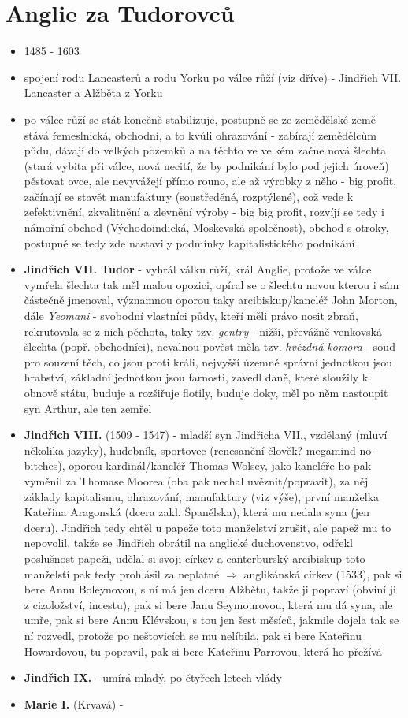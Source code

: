 \documentclass{article}
\begin{document}
\part{Anglie za Tudorovců}
\begin{itemize}
  \item 1485 - 1603
  \item spojení rodu Lancasterů a rodu Yorku po válce růží (viz dříve) - Jindřich VII. Lancaster a Alžběta z Yorku
  \item po válce růží se stát konečně stabilizuje, postupně se ze zemědělské země stává řemeslnická, obchodní, a to kvůli ohrazování - zabírají zemědělcům půdu, dávají do velkých pozemků a na těchto ve velkém začne nová šlechta (stará vybita při válce, nová necití, že by podnikání bylo pod jejich úroveň) pěstovat ovce, ale nevyvážejí přímo rouno, ale až výrobky z něho - big profit, začínají se stavět manufaktury (soustředěné, rozptýlené), což vede k zefektivnění, zkvalitnění a zlevnění výroby - big big profit, rozvíjí se tedy i námořní obchod (Východoindická, Moskevská společnost), obchod s otroky, postupně se tedy zde nastavily podmínky kapitalistického podnikání
  \item \textbf{Jindřich VII. Tudor} - vyhrál válku růží, král Anglie, protože ve válce vymřela šlechta tak měl malou opozici, opíral se o šlechtu novou kterou i sám částečně jmenoval, významnou oporou taky arcibiskup/kancléř John Morton, dále \textit{Yeomani} - svobodní vlastníci půdy, kteří měli právo nosit zbraň, rekrutovala se z nich pěchota, taky tzv. \textit{gentry} - nižší, převážně venkovská šlechta (popř. obchodníci), nevalnou pověst měla tzv. \textit{hvězdná komora} - soud pro souzení těch, co jsou proti králi, nejvyšší územně správní jednotkou jsou hrabství, základní jednotkou jsou farnosti, zavedl daně, které sloužily k obnově státu, buduje a rozšiřuje flotily, buduje doky, měl po něm nastoupit syn Arthur, ale ten zemřel
  \item \textbf{Jindřich VIII.} (1509 - 1547) - mladší syn Jindřicha VII., vzdělaný (mluví několika jazyky), hudebník, sportovec (renesanční člověk? megamind-no-bitches), oporou kardinál/kancléř Thomas Wolsey, jako kancléře ho pak vyměnil za Thomase Moorea (oba pak nechal uvěznit/popravit), za něj základy kapitalismu, ohrazování, manufaktury (viz výše), první manželka Kateřina Aragonská (dcera zakl. Španělska), která mu nedala syna (jen dceru), Jindřich tedy chtěl u papeže toto manželství zrušit, ale papež mu to nepovolil, takže se Jindřich obrátil na anglické duchovenstvo, odřekl poslušnost papeži, udělal si svoji církev a canterburský arcibiskup toto manželstí pak tedy prohlásil za neplatné $\Rightarrow$ anglikánská církev (1533), pak si bere Annu Boleynovou, s ní má jen dceru Alžbětu, takže ji popraví (obviní ji z cizoložství, incestu), pak si bere Janu Seymourovou, která mu dá syna, ale umře, pak si bere Annu Klévskou, s tou jen šest měsíců, jakmile dojela tak se ní rozvedl, protože po neštovicích se mu nelíbila, pak si bere Kateřinu Howardovou, tu popravil, pak si bere Kateřinu Parrovou, která ho přežívá
  \item \textbf{Jindřich IX.} - umírá mladý, po čtyřech letech vlády
  \item \textbf{Marie I.} (Krvavá) -
\end{itemize}
\end{document}
